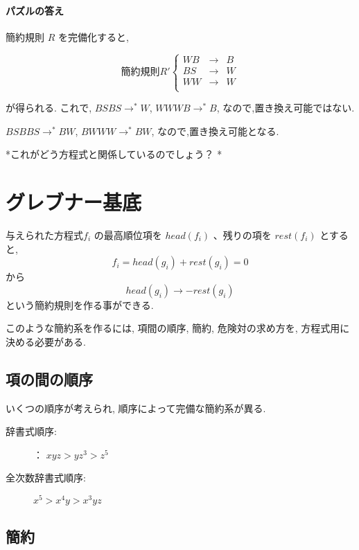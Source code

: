 \documentclass[a4j]{jarticle}
\begin{document}
\paragraph{パズルの答え}
\label{sec:org32d9f9d}

簡約規則 \(R\) を完備化すると,

$$簡約規則 R' \left\{ \begin{array}{rll}
WB & \rightarrow  &  B\\
BS & \rightarrow   & W  \\
WW & \rightarrow   & W  \\
      \end{array}
\right.$$

が得られる. これで, \(BSBS \rightarrow^* W\), \(WWWB \rightarrow^* B\),
なので,置き換え可能ではない.

\(BSBBS \rightarrow^* BW\), \(BWWW \rightarrow^* BW\),
なので,置き換え可能となる.

*これがどう方程式と関係しているのでしょう？ *

\section{グレブナー基底}
\label{sec:org073a21e}

与えられた方程式\(f_i\) の最高順位項を \(head(f_i)\) 、残りの項を
\(rest(f_i)\) とすると, $$f_i = head(g_i) + rest(g_i)  = 0$$ から
$$head(g_i) \rightarrow - rest(g_i)$$ という簡約規則を作る事ができる.

このような簡約系を作るには, 項間の順序, 簡約, 危険対の求め方を,
方程式用に決める必要がある.

\subsection{項の間の順序}
\label{sec:org5f3ddbf}

いくつの順序が考えられ, 順序によって完備な簡約系が異る.

\begin{description}
\item[{辞書式順序:}] ： \(xyz > yz^3 > z^5\)

\item[{全次数辞書式順序:}] \(x^5 > x^4y > x^3yz\)
\end{description}

\subsection{簡約}
\label{sec:org1d26261}
\end{document}

